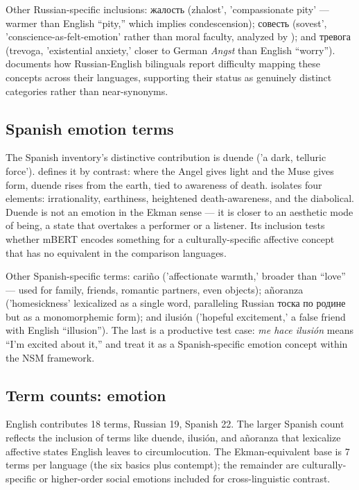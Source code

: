 Other Russian-specific inclusions: жалость (zhalost', 'compassionate pity' --- warmer than English ``pity,'' which implies condescension); совесть (sovest', 'conscience-as-felt-emotion' rather than moral faculty, analyzed by \textcite{wierzbicka1992}); and тревога (trevoga, 'existential anxiety,' closer to German \emph{Angst} than English ``worry''). \textcite{pavlenko2005} documents how Russian-English bilinguals report difficulty mapping these concepts across their languages, supporting their status as genuinely distinct categories rather than near-synonyms.

\subsection{Spanish emotion terms}
\label{sec:spanish-emotion}

The Spanish inventory's distinctive contribution is duende ('a dark, telluric force'). \textcite{garcialorca1933} defines it by contrast: where the Angel gives light and the Muse gives form, duende rises from the earth, tied to awareness of death. \textcite{maurer2004} isolates four elements: irrationality, earthiness, heightened death-awareness, and the diabolical. Duende is not an emotion in the Ekman sense --- it is closer to an aesthetic mode of being, a state that overtakes a performer or a listener. Its inclusion tests whether mBERT encodes something for a culturally-specific affective concept that has no equivalent in the comparison languages.

Other Spanish-specific terms: cariño ('affectionate warmth,' broader than ``love'' --- used for family, friends, romantic partners, even objects); añoranza ('homesickness' lexicalized as a single word, paralleling Russian тоска по родине but as a monomorphemic form); and ilusión ('hopeful excitement,' a false friend with English ``illusion''). The last is a productive test case: \emph{me hace ilusión} means ``I'm excited about it,'' and \textcite{goddard2002} treat it as a Spanish-specific emotion concept within the NSM framework.

\subsection{Term counts: emotion}

English contributes 18 terms, Russian 19, Spanish 22. The larger Spanish count reflects the inclusion of terms like duende, ilusión, and añoranza that lexicalize affective states English leaves to circumlocution. The Ekman-equivalent base is 7 terms per language (the six basics plus contempt); the remainder are culturally-specific or higher-order social emotions included for cross-linguistic contrast.

